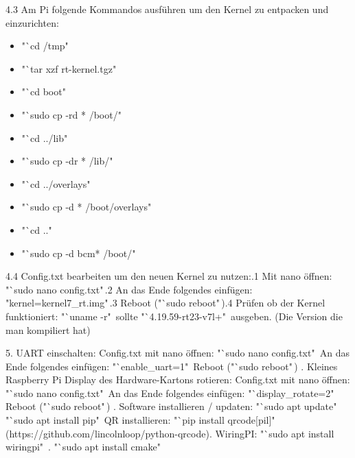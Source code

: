 \documentclass[12pt,a4paper,bibliography=totoc,listof=totoc]{scrartcl}
\begin{document}
4.3 Am Pi folgende Kommandos ausführen um den Kernel zu entpacken und einzurichten:\newline
\begin{itemize}
    \item "`cd /tmp"\,
    \item "`tar xzf rt-kernel.tgz"\,
    \item "`cd boot"\,
    \item "`sudo cp -rd * /boot/"\,
    \item "`cd ../lib"\,
    \item "`sudo cp -dr * /lib/"\,
    \item "`cd ../overlays"\,
    \item "`sudo cp -d * /boot/overlays"\,
    \item "`cd .."\,
    \item "`sudo cp -d bcm* /boot/"\,
\end {itemize}

4.4 Config.txt bearbeiten um den neuen Kernel zu nutzen:.1 Mit nano öffnen: "`sudo nano config.txt"\,.2 An das Ende folgendes einfügen: "kernel=kernel7\_rt.img"\,.3 Reboot ("`sudo reboot"\,).4 Prüfen ob der Kernel funktioniert: "`uname -r" \,sollte "`4.19.59-rt23-v7l+"\, ausgeben. 
      (Die Version die man kompiliert hat)\newline
\newline

5. UART einschalten: Config.txt mit nano öffnen: "`sudo nano config.txt"\, An das Ende folgendes einfügen: "`enable\_uart=1"\, Reboot ("`sudo reboot"\,)\newline
{}. Kleines Raspberry Pi Display des Hardware-Kartons rotieren: Config.txt mit nano öffnen: "`sudo nano config.txt"\, An das Ende folgendes einfügen: "`display\_rotate=2"\, Reboot ("`sudo reboot"\,)\newline
{}. Software installieren / updaten: "`sudo apt update"\, "`sudo apt install pip"\, QR installieren: "`pip install qrcode[pil]"\,
    (https://github.com/lincolnloop/python-qrcode). WiringPI: "`sudo apt install wiringpi"\ . "`sudo apt install cmake"\ \newline
\end{document}
